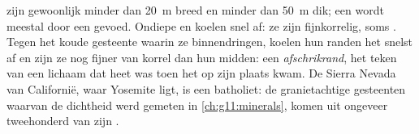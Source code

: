  zijn gewoonlijk minder dan \qty{20}{m} breed en  minder dan \qty{50}{m}
dik; een  wordt meestal door een  gevoed. Ondiepe  en  koelen snel af:
ze zijn fijnkorrelig, soms . Tegen het koude gesteente waarin ze
binnendringen, koelen hun randen het snelst af en zijn ze nog fijner van korrel dan
hun midden: een \emph{afschrikrand}, het teken van een lichaam dat heet was toen
het op zijn plaats kwam. De Sierra Nevada van Californië, waar Yosemite ligt,
is een batholiet: de granietachtige gesteenten waarvan de dichtheid werd gemeten in
\cref{ch:g11:minerals}, komen uit ongeveer tweehonderd van zijn .

